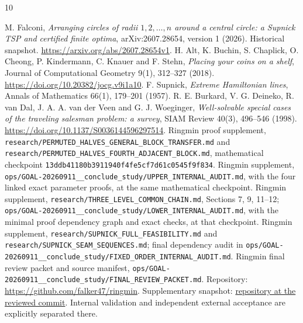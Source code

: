 \documentclass[11pt]{article}
\theoremstyle{definition}\newtheorem{definition}[theorem]{Definition}
\theoremstyle{remark}\newtheorem{remark}[theorem]{Remark}
\begin{document}
\begin{thebibliography}{10}
\small\raggedright
{} M. Falconi, \emph{Arranging circles of radii $1,2,\ldots,n$
around a central circle: a Supnick TSP and certified finite optima},
arXiv:2607.28654, version 1 (2026). Historical snapshot.
\url{https://arxiv.org/abs/2607.28654v1}.
 H. Alt, K. Buchin, S. Chaplick, O. Cheong, P. Kindermann,
C. Knauer and F. Stehn, \emph{Placing your coins on a shelf}, Journal of
Computational Geometry 9(1), 312--327 (2018).
\url{https://doi.org/10.20382/jocg.v9i1a10}.
 F. Supnick, \emph{Extreme Hamiltonian lines},
Annals of Mathematics 66(1), 179--201 (1957).
 R. E. Burkard, V. G. Deineko, R. van Dal, J. A. A. van der
Veen and G. J. Woeginger, \emph{Well-solvable special cases of the traveling
salesman problem: a survey}, SIAM Review 40(3), 496--546 (1998).
\url{https://doi.org/10.1137/S0036144596297514}.
 Ringmin proof supplement,
\nolinkurl{research/PERMUTED_HALVES_GENERAL_BLOCK_TRANSFER.md} and
\nolinkurl{research/PERMUTED_HALVES_FOURTH_ADJACENT_BLOCK.md},
mathematical checkpoint \texttt{13ddb41180b3911940f4fe5cf7d61c0545f9f834}.
 Ringmin supplement,
\nolinkurl{ops/GOAL-20260911__conclude_study/UPPER_INTERNAL_AUDIT.md},
with the four linked exact parameter proofs, at the same mathematical checkpoint.
 Ringmin supplement,
\nolinkurl{research/THREE_LEVEL_COMMON_CHAIN.md}, Sections 7, 9, 11--12;
\nolinkurl{ops/GOAL-20260911__conclude_study/LOWER_INTERNAL_AUDIT.md},
with the minimal proof dependency graph and exact checks, at that checkpoint.
 Ringmin supplement,
\nolinkurl{research/SUPNICK_FULL_FEASIBILITY.md} and
\nolinkurl{research/SUPNICK_SEAM_SEQUENCES.md}; final dependency audit in
\nolinkurl{ops/GOAL-20260911__conclude_study/FIXED_ORDER_INTERNAL_AUDIT.md}.
 Ringmin final review packet and source manifest,
\nolinkurl{ops/GOAL-20260911__conclude_study/FINAL_REVIEW_PACKET.md}.
Repository: \url{https://github.com/falker47/ringmin}.
Supplementary snapshot:
\href{https://github.com/falker47/ringmin/tree/3beb8d70c5b3748d370a92855847bdf574e5a14f}{repository at the reviewed commit}.
Internal validation
and independent external acceptance are explicitly separated there.
\end{thebibliography}
\end{document}
